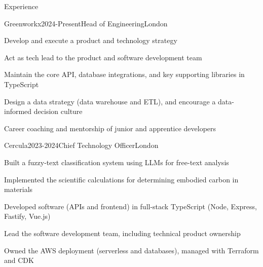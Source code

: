 \documentclass{resume} %
\begin{document}
\vspace{5 mm}

\begin{rSection}{Experience}

\begin{rSubsection}{{Greenworkx}}{2024-Present}{Head of Engineering}{London}
    \item Develop and execute a product and technology strategy
    \item Act as tech lead to the product and software development team
    \item Maintain the core API, database integrations, and key supporting libraries in TypeScript
    \item Design a data strategy (data warehouse and ETL), and encourage a data-informed decision culture
    \item Career coaching and mentorship of junior and apprentice developers
\end{rSubsection}

\begin{rSubsection}{{Cercula}}{2023-2024}{Chief Technology Officer}{London}
    \item Built a fuzzy-text classification system using LLMs for free-text analysis
    \item Implemented the scientific calculations for determining embodied carbon in materials
    \item Developed software (APIs and frontend) in full-stack TypeScript (Node, Express, Fastify, Vue.js)
    \item Lead the software development team, including technical product ownership
    \item Owned the AWS deployment (serverless and databases), managed with Terraform and CDK
\end{rSubsection}


\end{rSection}
\end{document}
